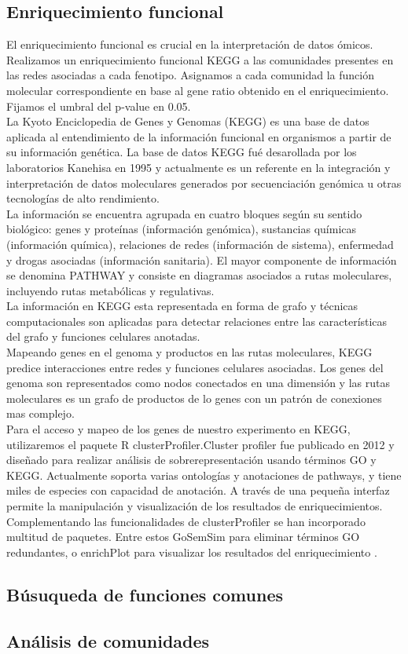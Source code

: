 \subsection*{Enriquecimiento funcional}
El enriquecimiento funcional es crucial en la interpretación de datos ómicos. Realizamos un enriquecimiento funcional KEGG a las comunidades presentes en las redes asociadas a cada fenotipo. Asignamos a cada comunidad la función molecular correspondiente en base al gene ratio obtenido en el enriquecimiento. Fijamos el umbral del p-value en 0.05. \\ 
La Kyoto Enciclopedia de Genes y Genomas (KEGG) es una base de datos aplicada al entendimiento de la información funcional en organismos a partir de su información genética. La base de datos KEGG fué desarollada por los laboratorios Kanehisa en 1995 y actualmente es un referente en la integración y interpretación de datos moleculares generados por secuenciación  genómica u otras tecnologías de alto rendimiento. \\ 
La información se encuentra agrupada en cuatro bloques según su sentido biológico: genes y proteínas (información genómica), sustancias químicas (información química), relaciones de redes (información de sistema), enfermedad y drogas asociadas (información sanitaria). El mayor componente de información se denomina PATHWAY y consiste en diagramas asociados a rutas moleculares, incluyendo rutas metabólicas y regulativas. \\
La información en KEGG esta representada en forma de grafo y técnicas computacionales son aplicadas para detectar relaciones entre las características del grafo y funciones celulares anotadas.  \\
Mapeando genes en el genoma y productos en las rutas moleculares, KEGG predice interacciones entre redes y funciones celulares asociadas. Los genes del genoma son representados como nodos conectados en una dimensión y las rutas moleculares es un grafo de productos de lo genes con un patrón de conexiones mas complejo. \cite{Ogata1999, Minoru}\\
Para el acceso y mapeo de los genes de nuestro experimento en KEGG, utilizaremos el paquete R clusterProfiler.Cluster profiler fue publicado en 2012 y diseñado para realizar análisis de sobrerepresentación usando términos GO y KEGG. Actualmente soporta varias ontologías y anotaciones de pathways, y tiene miles de especies con capacidad de anotación. A través de una pequeña interfaz permite la manipulación y visualización de los resultados de enriquecimientos. Complementando las funcionalidades de clusterProfiler se han incorporado multitud de paquetes. Entre estos GoSemSim para eliminar términos GO redundantes, o enrichPlot para visualizar los resultados del enriquecimiento \cite{Wu2021}.
\subsection*{Búsuqueda de funciones comunes}
\subsection*{Análisis de comunidades}